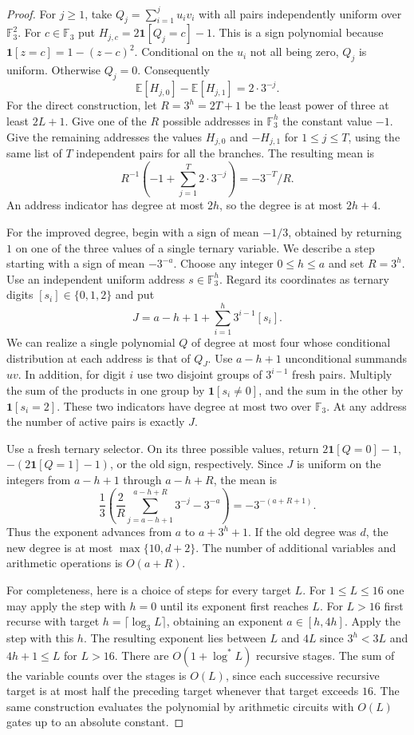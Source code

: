 \documentclass[11pt]{article}
\begin{document}
\begin{proof}
For $j\ge1$, take $Q_j=\sum_{i=1}^j u_i v_i$ with all pairs
independently uniform over $\mathbb F_3^2$. For $c\in\mathbb F_3$ put
$H_{j,c}=2\mathbf1[Q_j=c]-1$. This is a sign polynomial because
$\mathbf1[z=c]=1-(z-c)^2$. Conditional on the $u_i$ not all being
zero, $Q_j$ is uniform. Otherwise $Q_j=0$. Consequently
\[
    \mathbb E[H_{j,0}]-\mathbb E[H_{j,1}]=2\cdot 3^{-j}.
\]
For the direct construction, let $R=3^h=2T+1$ be the least power
of three at least $2L+1$. Give one of the $R$ possible addresses
in $\mathbb F_3^h$ the constant value $-1$. Give the remaining addresses
the values $H_{j,0}$ and $-H_{j,1}$ for $1\le j\le T$,
using the same list of $T$ independent pairs for all the branches.
The resulting mean is
\[
    R^{-1}\left(-1+\sum_{j=1}^T2\cdot3^{-j}\right)
       =-3^{-T}/R .
\]
An address indicator has degree at most $2h$, so the degree is at most
$2h+4$.

For the improved degree, begin with a sign of mean $-1/3$, obtained by
returning $1$ on one of the three values of a single ternary variable.
We describe a step starting with a sign of mean $-3^{-a}$. Choose any
integer $0\le h\le a$ and set $R=3^h$. Use an independent uniform
address $s\in\mathbb F_3^h$. Regard its coordinates as ternary digits
$[s_i]\in\{0,1,2\}$ and put
\[
   J=a-h+1+\sum_{i=1}^h 3^{i-1}[s_i].
\]
We can realize a single polynomial $Q$ of degree at most four whose
conditional distribution at each address is that of $Q_J$.
Use $a-h+1$ unconditional summands $u v$. In addition, for digit $i$
use two disjoint groups of $3^{i-1}$ fresh pairs. Multiply the sum of
the products in one group by $\mathbf1[s_i\ne0]$, and the sum in the
other by $\mathbf1[s_i=2]$. These two indicators have degree at most
two over $\mathbb F_3$. At any address the number of active pairs is
exactly $J$.

Use a fresh ternary selector. On its three possible values, return
$2\mathbf1[Q=0]-1$, $-(2\mathbf1[Q=1]-1)$, or the old sign,
respectively. Since $J$ is uniform on the integers from $a-h+1$
through $a-h+R$, the mean is
\[
 \frac13\left(
  \frac{2}{R}\sum_{j=a-h+1}^{a-h+R}3^{-j}-3^{-a}\right)
 =-3^{-(a+R+1)}.
\]
Thus the exponent advances from $a$ to $a+3^h+1$. If the old degree
was $d$, the new degree is at most $\max\{10,d+2\}$. The number of
additional variables and arithmetic operations is $O(a+R)$.

For completeness, here is a choice of steps for every target $L$.
For $1\le L\le 16$ one may apply the step with $h=0$ until its
exponent first reaches $L$. For $L>16$ first recurse with target
$h=\lceil\log_3 L\rceil$, obtaining an exponent $a\in[h,4h]$.
Apply the step with this $h$. The resulting exponent lies between
$L$ and $4L$ since $3^h<3L$ and $4h+1\le L$ for $L>16$.
There are $O(1+\log^* L)$ recursive stages. The sum of the variable
counts over the stages is $O(L)$, since each successive recursive
target is at most half the preceding target whenever that target
exceeds $16$. The same construction evaluates the polynomial by
arithmetic circuits with $O(L)$ gates up to an absolute constant.
\end{proof}
\end{document}

